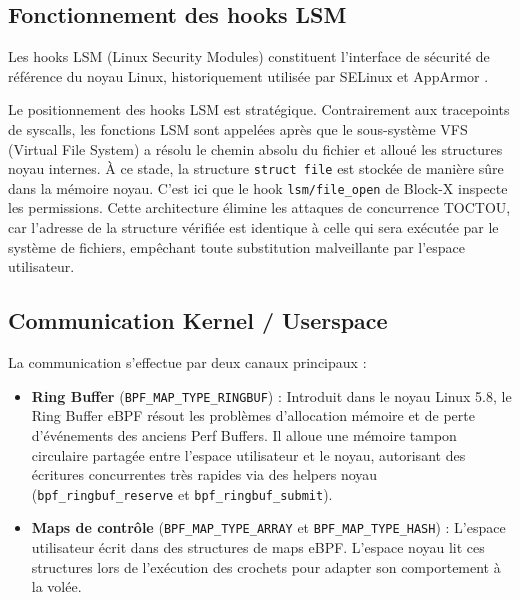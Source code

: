 \documentclass[11pt,a4paper]{article}
\begin{document}
\subsection{Fonctionnement des hooks LSM}
Les hooks LSM (Linux Security Modules) constituent l'interface de sécurité de référence du noyau Linux, historiquement utilisée par SELinux et AppArmor \cite{lsm}.

Le positionnement des hooks LSM est stratégique. Contrairement aux tracepoints de syscalls, les fonctions LSM sont appelées après que le sous-système VFS (Virtual File System) a résolu le chemin absolu du fichier et alloué les structures noyau internes. À ce stade, la structure \texttt{struct file} est stockée de manière sûre dans la mémoire noyau. C'est ici que le hook \texttt{lsm/file\_open} de Block-X inspecte les permissions. Cette architecture élimine les attaques de concurrence TOCTOU, car l'adresse de la structure vérifiée est identique à celle qui sera exécutée par le système de fichiers, empêchant toute substitution malveillante par l'espace utilisateur.

\subsection{Communication Kernel / Userspace}
La communication s'effectue par deux canaux principaux :
\begin{itemize}
    \item \textbf{Ring Buffer} (\texttt{BPF\_MAP\_TYPE\_RINGBUF}) : Introduit dans le noyau Linux 5.8, le Ring Buffer eBPF résout les problèmes d'allocation mémoire et de perte d'événements des anciens Perf Buffers. Il alloue une mémoire tampon circulaire partagée entre l'espace utilisateur et le noyau, autorisant des écritures concurrentes très rapides via des helpers noyau (\texttt{bpf\_ringbuf\_reserve} et \texttt{bpf\_ringbuf\_submit}).
    \item \textbf{Maps de contrôle} (\texttt{BPF\_MAP\_TYPE\_ARRAY} et \texttt{BPF\_MAP\_TYPE\_HASH}) : L'espace utilisateur écrit dans des structures de maps eBPF. L'espace noyau lit ces structures lors de l'exécution des crochets pour adapter son comportement à la volée.
\end{itemize}
\end{document}
